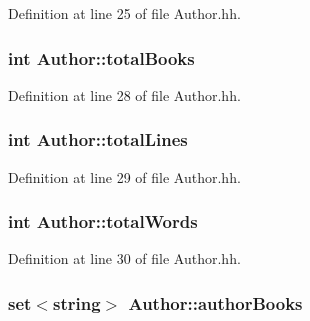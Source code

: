 Definition at line 25 of file Author.\+hh.

\hypertarget{class_author_ac870b8c861aa0f69cd2c4e7b8d414902}{
\subsubsection[{total\+Books}]{\setlength{\rightskip}{0pt plus 5cm}int Author\+::total\+Books\hspace{0.3cm}{\ttfamily [private]}}}\label{class_author_ac870b8c861aa0f69cd2c4e7b8d414902}


Definition at line 28 of file Author.\+hh.

\hypertarget{class_author_a8d818414bbd909287641b388601bf61a}{
\subsubsection[{total\+Lines}]{\setlength{\rightskip}{0pt plus 5cm}int Author\+::total\+Lines\hspace{0.3cm}{\ttfamily [private]}}}\label{class_author_a8d818414bbd909287641b388601bf61a}


Definition at line 29 of file Author.\+hh.

\hypertarget{class_author_a478c72fff965eb1ee8fcaddfe173715b}{
\subsubsection[{total\+Words}]{\setlength{\rightskip}{0pt plus 5cm}int Author\+::total\+Words\hspace{0.3cm}{\ttfamily [private]}}}\label{class_author_a478c72fff965eb1ee8fcaddfe173715b}


Definition at line 30 of file Author.\+hh.

\hypertarget{class_author_ad9ffe450cdafed2242936f6fcafa22b4}{
\subsubsection[{author\+Books}]{\setlength{\rightskip}{0pt plus 5cm}set$<$string$>$ Author\+::author\+Books\hspace{0.3cm}{\ttfamily [private]}}}\label{class_author_ad9ffe450cdafed2242936f6fcafa22b4}


